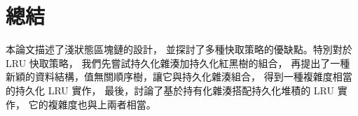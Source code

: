 \chapter{總結}

本論文描述了淺狀態區塊鏈的設計，
並探討了多種快取策略的優缺點。特別對於 LRU 快取策略，
我們先嘗試持久化雜湊加持久化紅黑樹的組合，
再提出了一種新穎的資料結構，值無關順序樹，讓它與持久化雜湊組合，
得到一種複雜度相當的持久化 LRU 實作，
最後，討論了基於持有化雜湊搭配持久化堆積的 LRU 實作，
它的複雜度也與上兩者相當。